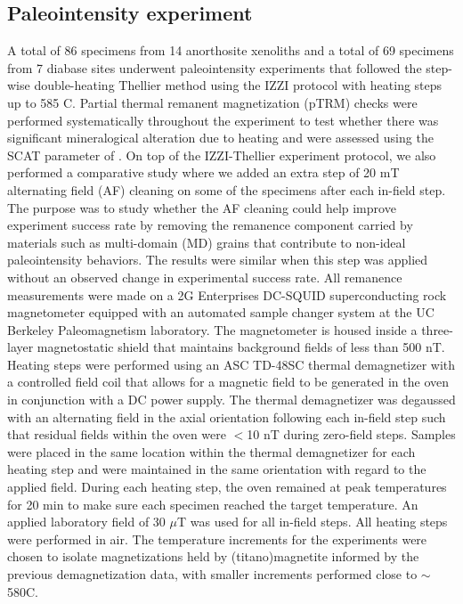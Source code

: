 \subsection*{Paleointensity experiment}
A total of 86 specimens from 14 anorthosite xenoliths and a total of 69 specimens from 7 diabase sites underwent paleointensity experiments that followed the step-wise double-heating Thellier method \citep{Thellier1959a} using the IZZI protocol \citep{Yu2004a} with heating steps up to 585 \textdegree C. Partial thermal remanent magnetization (pTRM) checks were performed systematically throughout the experiment to test whether there was significant mineralogical alteration due to heating and were assessed using the SCAT parameter of  \citealp{Shaar2013a}. On top of the IZZI-Thellier experiment protocol, we also performed a comparative study where we added an extra step of 20 mT alternating field (AF) cleaning on some of the specimens after each in-field step. The purpose was to study whether the AF cleaning could help improve experiment success rate by removing the remanence component carried by materials such as multi-domain (MD) grains that contribute to non-ideal paleointensity behaviors. The results were similar when this step was applied without an observed change in experimental success rate. All remanence measurements were made on a 2G Enterprises DC-SQUID superconducting rock magnetometer equipped with an automated sample changer system at the UC Berkeley Paleomagnetism laboratory. The magnetometer is housed inside a three-layer magnetostatic shield that maintains background fields of less than 500 nT. Heating steps were performed using an ASC TD-48SC thermal demagnetizer with a controlled field coil that allows for a magnetic field to be generated in the oven in conjunction with a DC power supply. The thermal demagnetizer was degaussed with an alternating field in the axial orientation following each in-field step such that residual fields within the oven were $<$10 nT during zero-field steps. Samples were placed in the same location within the thermal demagnetizer for each heating step and were maintained in the same orientation with regard to the applied field. During each heating step, the oven remained at peak temperatures for 20 min to make sure each specimen reached the target temperature. An applied laboratory field of 30 $\mu$T was used for all in-field steps. All heating steps were performed in air. The temperature increments for the experiments were chosen to isolate magnetizations held by (titano)magnetite informed by the previous demagnetization data, with smaller increments performed close to $\sim$580\textdegree C. 


